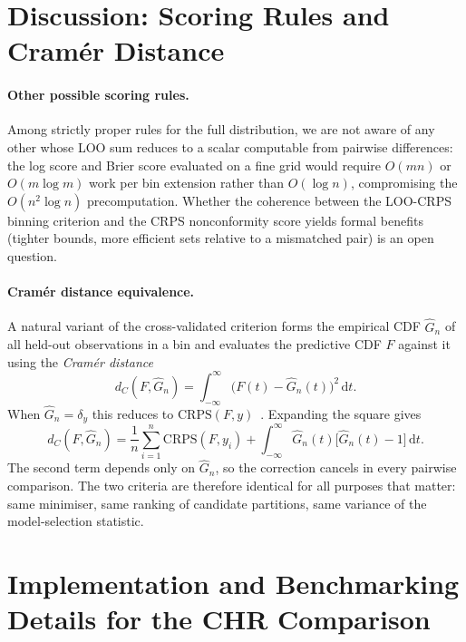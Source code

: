 \documentclass[11pt]{article}
\begin{document}
\section{Discussion: Scoring Rules and Cram\'{e}r Distance}
\label{app:scoring}

\paragraph{Other possible scoring rules.}
Among strictly proper rules for the full distribution, we are not aware of any
other whose LOO sum reduces to a scalar computable from pairwise differences:
the log score and Brier score evaluated on a fine grid would require $O(mn)$ or
$O(m\log m)$ work per bin extension rather than $O(\log n)$, compromising the
$O(n^2\log n)$ precomputation.
Whether the coherence between the LOO-CRPS binning criterion and the CRPS
nonconformity score yields formal benefits (tighter bounds, more efficient sets
relative to a mismatched pair) is an open question.

\paragraph{Cram\'{e}r distance equivalence.}
A natural variant of the cross-validated criterion forms the empirical CDF
$\hat{G}_n$ of all held-out observations in a bin and evaluates the predictive
CDF $F$ against it using the \emph{Cram\'{e}r distance}~\citep{Szekely2013,Baringhaus2004}
\[
  d_C(F,\hat{G}_n)
  = \int_{-\infty}^{\infty}\!\bigl(F(t) - \hat{G}_n(t)\bigr)^2\,\mathrm{d}t.
\]
When $\hat{G}_n = \delta_y$ this reduces to $\mathrm{CRPS}(F,y)$~\citep{GneitingRaftery2007}.
Expanding the square gives
\begin{equation}
  \label{eq:cramer-crps}
  d_C(F,\hat{G}_n)
  = \frac{1}{n}\sum_{i=1}^n \mathrm{CRPS}(F,y_i)
  + \int_{-\infty}^{\infty}\hat{G}_n(t)\bigl[\hat{G}_n(t)-1\bigr]\,\mathrm{d}t.
\end{equation}
The second term depends only on $\hat{G}_n$, so the correction cancels in every
pairwise comparison.
The two criteria are therefore identical for all purposes that matter: same
minimiser, same ranking of candidate partitions, same variance of the
model-selection statistic.

\section{Implementation and Benchmarking Details for the CHR Comparison}
\label{app:chr}
\end{document}
